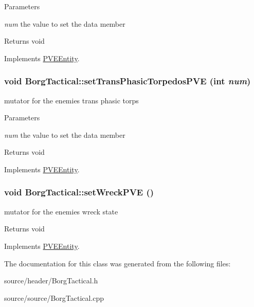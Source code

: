 \begin{DoxyParams}{Parameters}
\item[{\em num}]the value to set the data member\end{DoxyParams}
\begin{DoxyReturn}{Returns}
void 
\end{DoxyReturn}


Implements \hyperlink{classPVEEntity}{PVEEntity}.

\hypertarget{classBorgTactical_a4167123bef0b0fa986c180592cb6d729}{
\subsubsection[{setTransPhasicTorpedosPVE}]{\setlength{\rightskip}{0pt plus 5cm}void BorgTactical::setTransPhasicTorpedosPVE (int {\em num})}}
\label{d0/d4e/classBorgTactical_a4167123bef0b0fa986c180592cb6d729}
mutator for the enemies trans phasic torps


\begin{DoxyParams}{Parameters}
\item[{\em num}]the value to set the data member\end{DoxyParams}
\begin{DoxyReturn}{Returns}
void 
\end{DoxyReturn}


Implements \hyperlink{classPVEEntity}{PVEEntity}.

\hypertarget{classBorgTactical_a46369732b46f077b30b9c5616755e747}{
\subsubsection[{setWreckPVE}]{\setlength{\rightskip}{0pt plus 5cm}void BorgTactical::setWreckPVE ()}}
\label{d0/d4e/classBorgTactical_a46369732b46f077b30b9c5616755e747}
mutator for the enemies wreck state

\begin{DoxyReturn}{Returns}
void 
\end{DoxyReturn}


Implements \hyperlink{classPVEEntity}{PVEEntity}.



The documentation for this class was generated from the following files:\begin{DoxyCompactItemize}
\item 
source/header/BorgTactical.h\item 
source/source/BorgTactical.cpp\end{DoxyCompactItemize}
